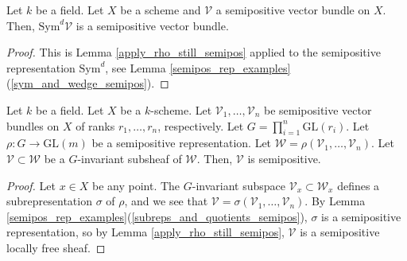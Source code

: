 \begin{lemma}\label{symd_semipos}
Let $k$ be a field.
Let $X$ be a scheme and $\mathcal{V}$ a semipositive vector bundle on $X$.
Then, $\mathrm{Sym}^d\mathcal{V}$ is a semipositive vector bundle.
\end{lemma}
\begin{proof}
This is Lemma \ref{apply_rho_still_semipos} applied to the semipositive representation $\mathrm{Sym}^d$, see Lemma \ref{semipos_rep_examples}(\ref{sym_and_wedge_semipos}).
\end{proof}


\begin{lemma}
Let $k$ be a field.
Let $X$ be a $k$-scheme.
Let $\mathcal{V}_1,\ldots,\mathcal{V}_n$ be semipositive vector bundles on $X$ of ranks $r_1,\ldots,r_n$, respectively.
Let $G=\prod_{i=1}^{n}\mathrm{GL}(r_i)$.
Let $\rho:G\to \mathrm{GL}(m)$ be a semipositive representation.
Let $\mathcal{W}=\rho(\mathcal{V}_1,\ldots,\mathcal{V}_n)$.
Let $\mathcal{V}\subset\mathcal{W}$ be a $G$-invariant subsheaf of $\mathcal{W}$.
Then, $\mathcal{V}$ is semipositive.
\end{lemma}

\begin{proof}
Let $x\in X$ be any point.
The $G$-invariant subspace $\mathcal{V}_x\subset\mathcal{W}_x$ defines a subrepresentation $\sigma$ of $\rho$, and we see that $\mathcal{V}=\sigma(\mathcal{V}_1,\ldots,\mathcal{V}_n)$.
By Lemma \ref{semipos_rep_examples}(\ref{subreps_and_quotients_semipos}), $\sigma$ is a semipositive representation, so by Lemma \ref{apply_rho_still_semipos}, $\mathcal{V}$ is a semipositive locally free sheaf.
\end{proof}







